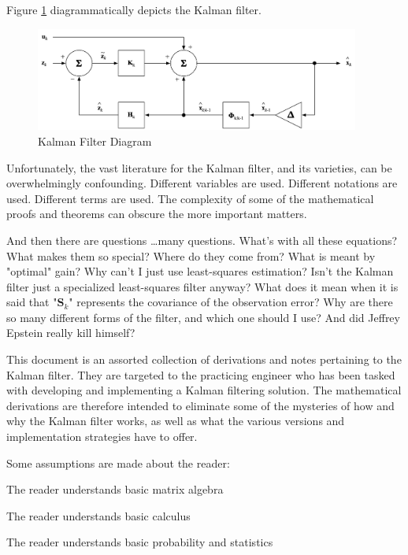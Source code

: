 \documentclass[12pt]{article}
\begin{document}
Figure \ref{fig:kf-diagram} diagrammatically depicts the Kalman filter.

\begin{figure}[ht]
    \centering
    \includegraphics[width=0.95\textwidth]{images/KF-Diagram.png}
    \caption{Kalman Filter Diagram}
    \label{fig:kf-diagram}
\end{figure}

Unfortunately, the vast literature for the Kalman filter, and its varieties, can be
overwhelmingly confounding. Different variables are used. Different notations are used.
Different terms are used. The complexity of some of the mathematical proofs and theorems
can obscure the more important matters.

And then there are questions \ldots many questions.
What’s with all these equations?
What makes them so special?
Where do they come from?
What is meant by "optimal" gain?
Why can’t I just use least-squares estimation?
Isn’t the Kalman filter just a specialized least-squares filter anyway?
What does it mean when it is said that "$\mathbf{S}_k$" represents the covariance of the observation error?
Why are there so many different forms of the filter, and which one should I use?
And did Jeffrey Epstein really kill himself?

This document is an assorted collection of derivations and notes pertaining to the Kalman
filter. They are targeted to the practicing engineer who has been tasked with developing
and implementing a Kalman filtering solution. The mathematical derivations are therefore
intended to eliminate some of the mysteries of how and why the Kalman filter works, as
well as what the various versions and implementation strategies have to offer.

Some assumptions are made about the reader:

\begin{myitemize}
    \item The reader understands basic matrix algebra
    \item The reader understands basic calculus
    \item The reader understands basic probability and statistics
\end{myitemize}
\end{document}
